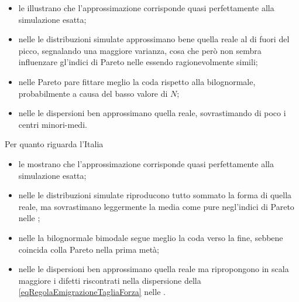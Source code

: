       \begin{itemize}[
        label=\(\diamond\),
      ]
        \item le  illustrano che l'approssimazione corrisponde quasi perfettamente alla simulazione esatta;
        \item nelle  le distribuzioni simulate approssimano bene quella reale al di fuori del picco, segnalando una maggiore varianza, cosa che però non sembra influenzare gl'indici di Pareto nelle  essendo ragionevolmente simili;
        \item nelle  Pareto pare fittare meglio la coda rispetto alla bilognormale, probabilmente a causa del basso valore di \(N\);
        \item nelle  le dispersioni ben approssimano quella reale, sovrastimando di poco i centri minori-medi.
      \end{itemize}

      Per quanto riguarda l'Italia

      \begin{itemize}[
        label=\(\diamond\),
      ]
        \item le  mostrano che l'approssimazione corrisponde quasi perfettamente alla simulazione esatta;
        \item nelle  le distribuzioni simulate riproducono tutto sommato la forma di quella reale, ma sovrastimano leggermente la media come pure negl'indici di Pareto nelle ;
        \item nelle  la bilognormale bimodale segue meglio la coda verso la fine, sebbene coincida colla Pareto nella prima metà;
        \item nelle  le dispersioni ben approssimano quella reale ma ripropongono in scala maggiore i difetti riscontrati nella dispersione della \ref{eqRegolaEmigrazioneTagliaForza} nelle .
      \end{itemize}

